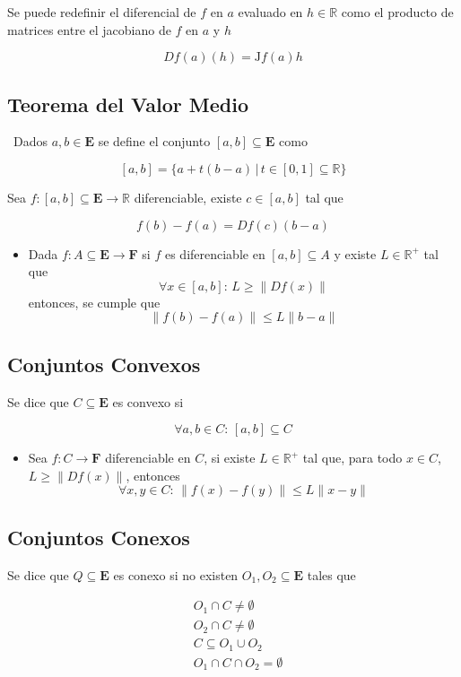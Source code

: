 Se puede redefinir el diferencial de $f$ en $a$ evaluado en $h\in\mathbb{R}$ como el producto de matrices entre el jacobiano de $f$ en $a$ y $h$

\[Df(a)(h) = \mathrm{J}f(a)h\]

\subsection{Teorema del Valor Medio}
\label{T:ValorMedio}
$\,$\smallbreak
Dados $a,b\in\mathbf{E}$ se define el conjunto $[a,b]\subseteq\mathbf{E}$ como

\[[a, b]=\{a+t(b-a)\,|\,t\in [0,1]\subseteq\mathbb{R}\}\]
\bigbreak

Sea $f:[a,b]\subseteq\mathbf{E}\to\mathbb{R}$ diferenciable, existe $c\in [a, b]$ tal que

\[f(b)-f(a) = Df(c)(b-a)\]
\bigbreak

\begin{itemize}
    \item Dada $f:A\subseteq\mathbf{E}\to\mathbf{F}$ si $f$ es diferenciable en $[a,b]\subseteq A$ y existe $L\in\mathbb{R}^+$ tal que
    \[\forall x\in [a,b]:\,L\geq \|Df(x)\|\]
    entonces, se cumple que
    \[\|f(b)-f(a)\|\leq L\|b-a\|\]
\end{itemize}

\subsection{Conjuntos Convexos}

Se dice que $C\subseteq\mathbf{E}$ es convexo si

\[\forall a,b \in C:\,[a,b]\subseteq C\]
\bigbreak
\begin{itemize}
    \item Sea $f:C\to\mathbf{F}$ diferenciable en $C$, si existe $L\in\mathbb{R}^+$ tal que, para todo $x\in C$, $L\geq\|Df(x)\|$, entonces
    \[\forall x,y\in C:\,\|f(x)-f(y)\|\leq L\|x-y\|\]
\end{itemize}

\subsection{Conjuntos Conexos}

Se dice que $Q\subseteq\mathbf{E}$ es conexo si no existen $O_1,O_2\subseteq\mathbf{E}$ tales que

\begin{equation}
\begin{split}
    & O_1 \cap C \neq \emptyset\\
    & O_2 \cap C \neq \emptyset\\
    & C \subseteq O_1 \cup O_2\\
    & O_1 \cap C \cap O_2 = \emptyset\\
\end{split}
\nonumber
\end{equation}

